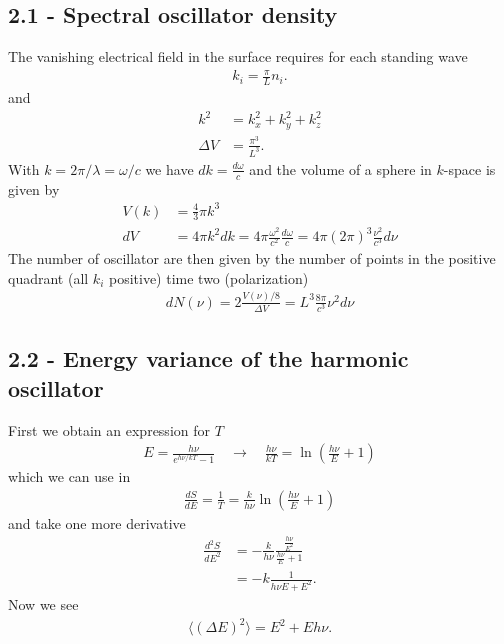 \documentclass[../main.tex]{subfiles}
\begin{document}
\subsection{2.1 - Spectral oscillator density}
The vanishing electrical field in the surface requires for each standing wave
\begin{align}
    k_i=\frac{\pi}{L}n_i. 
\end{align}
and
\begin{align}
    k^2&=k_x^2+k_y^2+k_z^2\\
    \Delta V&=\frac{\pi^3}{L^3}.
\end{align}
With $k=2\pi/\lambda = \omega/c$ we have $dk=\frac{d\omega}{c}$ and the volume of a sphere in $k$-space is given by
\begin{align}
    V(k)&=\frac{4}{3}\pi k^3\\
    dV&=4\pi k^2 dk=4\pi \frac{\omega^2}{c^2} \frac{d\omega}{c} 
    =4\pi (2\pi)^3\frac{\nu^2}{c^3} d\nu 
\end{align}
The number of oscillator are then given by the number of points in the positive quadrant (all $k_i$ positive) time two (polarization)
\begin{align}
    dN(\nu)=2\frac{V(\nu)/8}{\Delta V}=L^3 \frac{8\pi}{c^3}\nu^2d\nu
\end{align}

\subsection{2.2 - Energy variance of the harmonic oscillator}
First we obtain an expression for $T$
\begin{align}
    E=\frac{h\nu}{e^{h\nu/kT}-1}\quad\rightarrow\quad\frac{h\nu}{kT}=\ln\left(\frac{h\nu}{E}+1\right)
\end{align}
which we can use in
\begin{align}
    \frac{dS}{dE}=\frac{1}{T}=\frac{k}{h\nu}\ln\left(\frac{h\nu}{E}+1\right)
\end{align}
and take one more derivative
\begin{align}
    \frac{d^2S}{dE^2}&=-\frac{k}{h\nu}\frac{\frac{h\nu}{E^2}}{\frac{h\nu}{E}+1}\\
    &=-k\frac{1}{ h\nu E+E^2}.
\end{align}
Now we see
\begin{align}
    \langle(\Delta E)^2\rangle=E^2+E h \nu.
\end{align}
\end{document}
